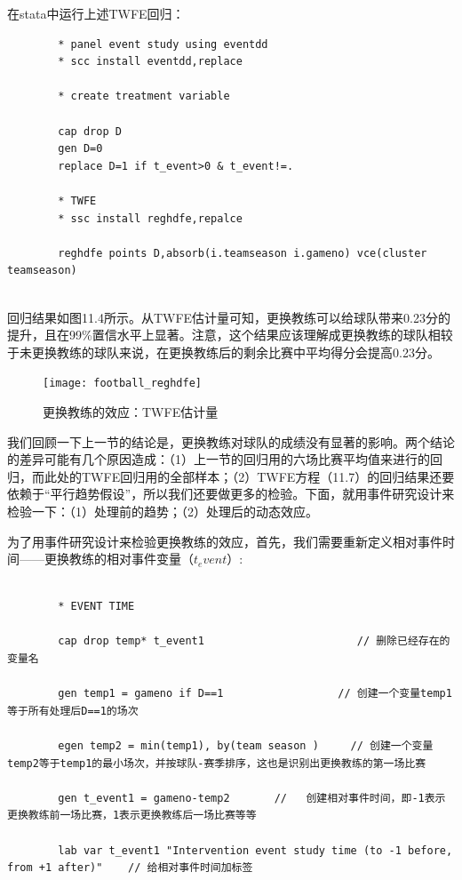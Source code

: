 \documentclass[cn,12pt,math=newtx,citestyle=gb7714-2015,bibstyle=gb7714-2015]{elegantbook}
\begin{document}
	  在stata中运行上述TWFE回归：
	  
	  \begin{lstlisting}
	  	* panel event study using eventdd
	  	* scc install eventdd,replace
	  	
	  	* create treatment variable  
	  	
	  	cap drop D
	  	gen D=0
	  	replace D=1 if t_event>0 & t_event!=.
	  	
	  	* TWFE
	  	* ssc install reghdfe,repalce
	  	
	  	reghdfe points D,absorb(i.teamseason i.gameno) vce(cluster teamseason)
	  	
	  \end{lstlisting}
  
	  回归结果如图11.4所示。从TWFE估计量可知，更换教练可以给球队带来0.23分的提升，且在99\%置信水平上显著。注意，这个结果应该理解成更换教练的球队相较于未更换教练的球队来说，在更换教练后的剩余比赛中平均得分会提高0.23分。
	  
	  \begin{figure}[tbph]
	  	\centering
	  	\texttt{[image: football\_reghdfe]}
	  	\caption{更换教练的效应：TWFE估计量}
	  	\label{fig:footballreghdfe}
	  \end{figure}
	  
	  我们回顾一下上一节的结论是，更换教练对球队的成绩没有显著的影响。两个结论的差异可能有几个原因造成：（1）上一节的回归用的六场比赛平均值来进行的回归，而此处的TWFE回归用的全部样本；（2）TWFE方程（11.7）的回归结果还要依赖于“平行趋势假设”，所以我们还要做更多的检验。下面，就用事件研究设计来检验一下：（1）处理前的趋势；（2）处理后的动态效应。
	  
	  为了用事件研究设计来检验更换教练的效应，首先，我们需要重新定义相对事件时间——更换教练的相对事件变量（$t_event$）:
	  
	  \begin{lstlisting}
	  	
	  	* EVENT TIME
	  	
	  	cap drop temp* t_event1                        // 删除已经存在的变量名
	  	
	  	gen temp1 = gameno if D==1                  // 创建一个变量temp1等于所有处理后D==1的场次
	  	
	  	egen temp2 = min(temp1), by(team season )     // 创建一个变量temp2等于temp1的最小场次，并按球队-赛季排序，这也是识别出更换教练的第一场比赛
	  	
	  	gen t_event1 = gameno-temp2       //   创建相对事件时间，即-1表示更换教练前一场比赛，1表示更换教练后一场比赛等等
	  	
	  	lab var t_event1 "Intervention event study time (to -1 before, from +1 after)"    // 给相对事件时间加标签
	  	
	  \end{lstlisting}
	  
\end{document}
